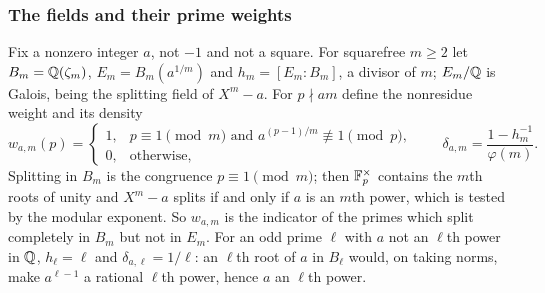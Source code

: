 \subsubsection{The fields and their prime weights}
Fix a nonzero integer $a$, not $-1$ and not a square. For squarefree $m\ge2$
let $B_m=\mathbb{Q}(\zeta_m)$, $E_m=B_m(a^{1/m})$ and $h_m=[E_m:B_m]$, a divisor of
$m$; $E_m/\mathbb{Q}$ is Galois, being the splitting field of $X^m-a$. For
$p\nmid am$ define the nonresidue weight and its density
\begin{equation}\label{grp:eq:kummer-weight}
 w_{a,m}(p)=\begin{cases}
 1,&p\equiv1\pmod m\text{ and }a^{(p-1)/m}\not\equiv1\pmod p,\\
 0,&\text{otherwise},
 \end{cases}
 \qquad
 \delta_{a,m}=\frac{1-h_m^{-1}}{\varphi(m)} .
\end{equation}
Splitting in $B_m$ is the congruence $p\equiv1\pmod m$; then $\mathbb{F}_p^\times$
contains the $m$th roots of unity and $X^m-a$ splits if and only if $a$ is an
$m$th power, which is tested by the modular exponent. So $w_{a,m}$ is the
indicator of the primes which split completely in $B_m$ but not in $E_m$. For
an odd prime $\ell$ with $a$ not an $\ell$th power in $\mathbb{Q}$, $h_\ell=\ell$ and
$\delta_{a,\ell}=1/\ell$: an $\ell$th root of $a$ in $B_\ell$ would, on taking
norms, make $a^{\ell-1}$ a rational $\ell$th power, hence $a$ an $\ell$th
power.

